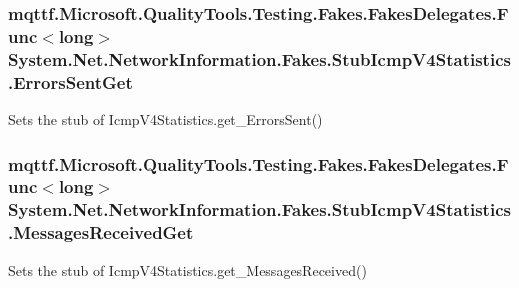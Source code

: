 \hypertarget{class_system_1_1_net_1_1_network_information_1_1_fakes_1_1_stub_icmp_v4_statistics_abd51bdfe1be88bcf1a15548eb48cae9f}{
\subsubsection[{Errors\-Sent\-Get}]{\setlength{\rightskip}{0pt plus 5cm}mqttf.\-Microsoft.\-Quality\-Tools.\-Testing.\-Fakes.\-Fakes\-Delegates.\-Func$<$long$>$ System.\-Net.\-Network\-Information.\-Fakes.\-Stub\-Icmp\-V4\-Statistics.\-Errors\-Sent\-Get}}\label{class_system_1_1_net_1_1_network_information_1_1_fakes_1_1_stub_icmp_v4_statistics_abd51bdfe1be88bcf1a15548eb48cae9f}


Sets the stub of Icmp\-V4\-Statistics.\-get\-\_\-\-Errors\-Sent()

\hypertarget{class_system_1_1_net_1_1_network_information_1_1_fakes_1_1_stub_icmp_v4_statistics_a1e10ffe9a8c0a16c7a92db4831f3860f}{
\subsubsection[{Messages\-Received\-Get}]{\setlength{\rightskip}{0pt plus 5cm}mqttf.\-Microsoft.\-Quality\-Tools.\-Testing.\-Fakes.\-Fakes\-Delegates.\-Func$<$long$>$ System.\-Net.\-Network\-Information.\-Fakes.\-Stub\-Icmp\-V4\-Statistics.\-Messages\-Received\-Get}}\label{class_system_1_1_net_1_1_network_information_1_1_fakes_1_1_stub_icmp_v4_statistics_a1e10ffe9a8c0a16c7a92db4831f3860f}


Sets the stub of Icmp\-V4\-Statistics.\-get\-\_\-\-Messages\-Received()


